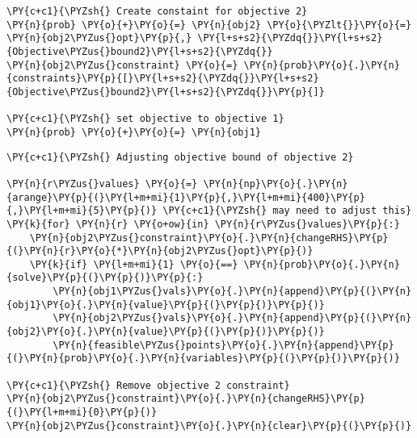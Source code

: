     \begin{tcolorbox}[breakable, size=fbox, boxrule=1pt, pad at break*=1mm,colback=cellbackground, colframe=cellborder]
\begin{Verbatim}[commandchars=\\\{\}]
\PY{c+c1}{\PYZsh{} Create constaint for objective 2}
\PY{n}{prob} \PY{o}{+}\PY{o}{=} \PY{n}{obj2} \PY{o}{\PYZlt{}}\PY{o}{=} \PY{n}{obj2\PYZus{}opt}\PY{p}{,} \PY{l+s+s2}{\PYZdq{}}\PY{l+s+s2}{Objective\PYZus{}bound2}\PY{l+s+s2}{\PYZdq{}}
\PY{n}{obj2\PYZus{}constraint} \PY{o}{=} \PY{n}{prob}\PY{o}{.}\PY{n}{constraints}\PY{p}{[}\PY{l+s+s2}{\PYZdq{}}\PY{l+s+s2}{Objective\PYZus{}bound2}\PY{l+s+s2}{\PYZdq{}}\PY{p}{]}

\PY{c+c1}{\PYZsh{} set objective to objective 1}
\PY{n}{prob} \PY{o}{+}\PY{o}{=} \PY{n}{obj1}
\end{Verbatim}
\end{tcolorbox}

    \begin{tcolorbox}[breakable, size=fbox, boxrule=1pt, pad at break*=1mm,colback=cellbackground, colframe=cellborder]
\begin{Verbatim}[commandchars=\\\{\}]
\PY{c+c1}{\PYZsh{} Adjusting objective bound of objective 2}

\PY{n}{r\PYZus{}values} \PY{o}{=} \PY{n}{np}\PY{o}{.}\PY{n}{arange}\PY{p}{(}\PY{l+m+mi}{1}\PY{p}{,}\PY{l+m+mi}{400}\PY{p}{,}\PY{l+m+mi}{5}\PY{p}{)} \PY{c+c1}{\PYZsh{} may need to adjust this}
\PY{k}{for} \PY{n}{r} \PY{o+ow}{in} \PY{n}{r\PYZus{}values}\PY{p}{:}
    \PY{n}{obj2\PYZus{}constraint}\PY{o}{.}\PY{n}{changeRHS}\PY{p}{(}\PY{n}{r}\PY{o}{*}\PY{n}{obj2\PYZus{}opt}\PY{p}{)}
    \PY{k}{if} \PY{l+m+mi}{1} \PY{o}{==} \PY{n}{prob}\PY{o}{.}\PY{n}{solve}\PY{p}{(}\PY{p}{)}\PY{p}{:}
        \PY{n}{obj1\PYZus{}vals}\PY{o}{.}\PY{n}{append}\PY{p}{(}\PY{n}{obj1}\PY{o}{.}\PY{n}{value}\PY{p}{(}\PY{p}{)}\PY{p}{)}
        \PY{n}{obj2\PYZus{}vals}\PY{o}{.}\PY{n}{append}\PY{p}{(}\PY{n}{obj2}\PY{o}{.}\PY{n}{value}\PY{p}{(}\PY{p}{)}\PY{p}{)}
        \PY{n}{feasible\PYZus{}points}\PY{o}{.}\PY{n}{append}\PY{p}{(}\PY{n}{prob}\PY{o}{.}\PY{n}{variables}\PY{p}{(}\PY{p}{)}\PY{p}{)}

\PY{c+c1}{\PYZsh{} Remove objective 2 constraint}
\PY{n}{obj2\PYZus{}constraint}\PY{o}{.}\PY{n}{changeRHS}\PY{p}{(}\PY{l+m+mi}{0}\PY{p}{)}
\PY{n}{obj2\PYZus{}constraint}\PY{o}{.}\PY{n}{clear}\PY{p}{(}\PY{p}{)}
\end{Verbatim}
\end{tcolorbox}

